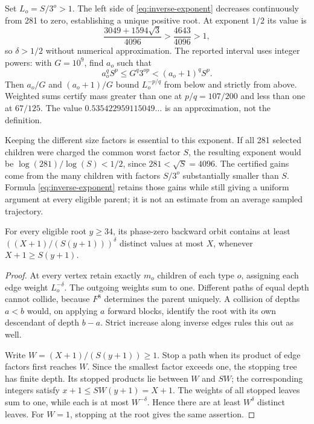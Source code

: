 Set $L_o=S/3^o>1$. The left side of \eqref{eq:inverse-exponent} decreases
continuously from 281 to zero, establishing a unique positive root.
At exponent $1/2$ its value is
\[
 \frac{3049+1594\sqrt3}{4096}>\frac{4643}{4096}>1,
\]
so $\delta>1/2$ without numerical approximation. The reported interval
uses integer powers: with $G=10^9$, find $a_o$ such that
\[
 a_o^q S^p\le G^q3^{op}<(a_o+1)^q S^p.
\]
Then $a_o/G$ and $(a_o+1)/G$ bound $L_o^{-p/q}$ from below and strictly
from above. Weighted sums certify mass greater than one at $p/q=107/200$
and less than one at $67/125$. The value
$0.535422959115049\ldots$ is an approximation, not the definition.

Keeping the different size factors is essential to this exponent. If all
281 selected children were charged the common worst factor $S$, the
resulting exponent would be $\log(281)/\log(S)<1/2$, since
$281<\sqrt S=4096$. The certified gains come from the many children
with factors $S/3^o$ substantially smaller than $S$. Formula
\eqref{eq:inverse-exponent} retains those gains while still giving a
uniform argument at every eligible parent; it is not an estimate from
an average sampled trajectory.

\begin{lemma}\label{lem:inverse-count}
For every eligible root $y\ge34$, its phase-zero backward orbit contains
at least $((X+1)/(S(y+1)))^\delta$ distinct values at most $X$, whenever
$X+1\ge S(y+1)$.
\end{lemma}
\begin{proof}
At every vertex retain exactly $m_o$ children of each type $o$, assigning
each edge weight $L_o^{-\delta}$. The outgoing weights sum to one.
Different paths of equal depth cannot collide, because $F^8$ determines
the parent uniquely. A collision of depths $a<b$ would, on applying $a$
forward blocks, identify the root with its own descendant of depth $b-a$.
Strict increase along inverse edges rules this out as well.

Write $W=(X+1)/(S(y+1))\ge1$. Stop a path when its product of edge factors
first reaches $W$. Since the smallest factor exceeds one, the stopping
tree has finite depth. Its stopped products lie between $W$ and $SW$;
the corresponding integers satisfy $x+1\le SW(y+1)=X+1$.
The weights of all stopped leaves sum to one, while each is at most
$W^{-\delta}$. Hence there are at least $W^\delta$ distinct leaves.
For $W=1$, stopping at the root gives the same assertion.
\end{proof}

